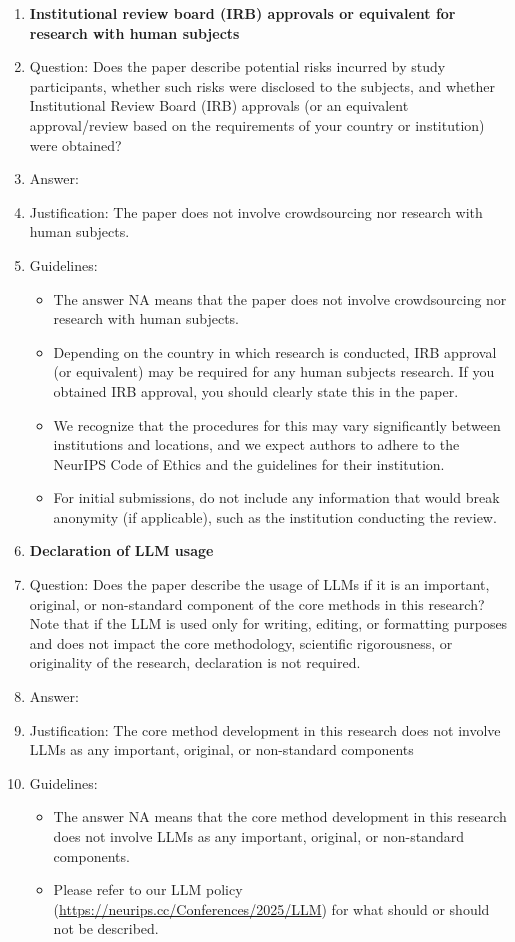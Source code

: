 \documentclass{article}
\begin{document}
\begin{enumerate}
\item {\bf Institutional review board (IRB) approvals or equivalent for research with human subjects}
    \item[] Question: Does the paper describe potential risks incurred by study participants, whether such risks were disclosed to the subjects, and whether Institutional Review Board (IRB) approvals (or an equivalent approval/review based on the requirements of your country or institution) were obtained?
    \item[] Answer: \answerNA{} %
    \item[] Justification: The paper does not involve crowdsourcing nor research with human subjects.
    \item[] Guidelines:
    \begin{itemize}
        \item The answer NA means that the paper does not involve crowdsourcing nor research with human subjects.
        \item Depending on the country in which research is conducted, IRB approval (or equivalent) may be required for any human subjects research. If you obtained IRB approval, you should clearly state this in the paper. 
        \item We recognize that the procedures for this may vary significantly between institutions and locations, and we expect authors to adhere to the NeurIPS Code of Ethics and the guidelines for their institution. 
        \item For initial submissions, do not include any information that would break anonymity (if applicable), such as the institution conducting the review.
    \end{itemize}

\item {\bf Declaration of LLM usage}
    \item[] Question: Does the paper describe the usage of LLMs if it is an important, original, or non-standard component of the core methods in this research? Note that if the LLM is used only for writing, editing, or formatting purposes and does not impact the core methodology, scientific rigorousness, or originality of the research, declaration is not required.
    \item[] Answer: \answerNA{} %
    \item[] Justification: The core method development in this research does not involve LLMs as any important, original, or non-standard components
    \item[] Guidelines:
    \begin{itemize}
        \item The answer NA means that the core method development in this research does not involve LLMs as any important, original, or non-standard components.
        \item Please refer to our LLM policy (\url{https://neurips.cc/Conferences/2025/LLM}) for what should or should not be described.
    \end{itemize}

\end{enumerate}
\end{document}
